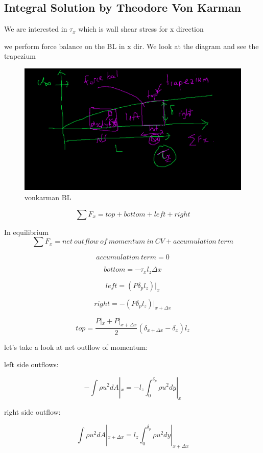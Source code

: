 \documentclass[11pt]{article}
\begin{document}
\subsection{Integral Solution by Theodore Von Karman}

We are interested in $\tau_x$ which is wall shear stress for x direction

we perform force balance on the BL in x dir. We look at the diagram and see the trapezium


\begin{figure}[H]
\centering

\includegraphics[width=\textwidth]{vonkarman BL.png}
\caption{vonkarman BL}
\label{H and Pb scattering}

\end{figure}

$$\sum F_x = top + bottom + left + right $$


In equilibrium
$$\sum F_x = net \ outflow \ of \ momentum \ in \ CV + accumulation\ term$$

$$accumulation\ term = 0 $$


$$bottom = - \tau_x l_z \Delta x$$

$$left = (P \delta_p l_z)|_x$$

$$right = -(P \delta_p l_z)|_{x+\Delta x}$$

$$top = \frac{P|_x + P|_{x+\Delta x}}{2} (\delta_{x+\Delta x} - \delta_{x}) l_z $$


let's take a look at net outflow of momentum:

left side outflows:

$$-\int \rho u^2 dA |_{x} = - l_z \int_0^{\delta_p} \rho u^2 dy |_x$$

right side outflow:

$$\int \rho u^2 dA |_{x+\Delta x} =  l_z \int_0^{\delta_p} \rho u^2 dy |_{x+\Delta x} $$
\end{document}
